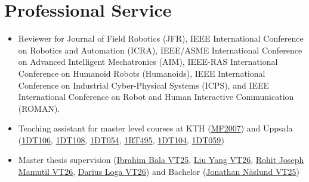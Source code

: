 \documentclass[a4paper,11pt]{article}
\newcommand{\resumeSubHeadingListStart}{\begin{itemize}[leftmargin=*,labelsep=0mm,itemsep=-2pt]}
\newcommand{\resumeSubHeadingListEnd}{\end{itemize}\vspace{2mm}}
\begin{document}
\section{\textbf{Professional Service}}
\resumeSubHeadingListStart
  \item \hspace{0.5em} Reviewer for Journal of Field Robotics (JFR), IEEE International Conference on Robotics and Automation (ICRA), IEEE/ASME International Conference on Advanced Intelligent Mechatronics (AIM), IEEE-RAS International Conference on Humanoid Robots (Humanoids), IEEE International Conference on Industrial Cyber-Physical Systems (ICPS), and IEEE International Conference on Robot and Human Interactive Communication (ROMAN).
  \vspace{-0.5em}
  \item \hspace{0.5em} Teaching assistant for master level courses at KTH (\href{https://www.kth.se/student/kurser/kurs/MF2007}{MF2007}) and Uppsala (\href{https://www.uu.se/en/study/course?query=1DT106}{1DT106}, \href{https://www.uu.se/en/study/course?query=1DT108}{1DT108}, \href{https://www.uu.se/en/study/course?query=1DT054}{1DT054},
  \href{https://www.uu.se/en/study/course?query=1RT495}{1RT495}, \href{https://www.uu.se/en/study/course?query=1DT104}{1DT104}, \href{https://www.uu.se/en/study/course?query=1DT059}{1DT059})
  \vspace{-0.6em}\item \hspace{0.5em} Master thesis supervision (\href{https://urn.kb.se/resolve?urn=urn:nbn:se:uu:diva-562947}{Ibrahim Bala VT25}, \href{https://urn.kb.se/resolve?urn=urn:nbn:se:uu:diva-590526}{Liu Yang VT26}, \href{https://urn.kb.se/resolve?urn=urn:nbn:se:uu:diva-596299}{Rohit Joseph Mamutil VT26}, \href{https://urn.kb.se/resolve?urn=urn:nbn:se:uu:diva-596231}{Darius Loga VT26}) and Bachelor (\href{https://urn.kb.se/resolve?urn=urn:nbn:se:uu:diva-564141}{Jonathan N\"{a}slund VT25})
  \vspace{-0.6em}
\resumeSubHeadingListEnd
\vspace{-5mm}

\end{document}
